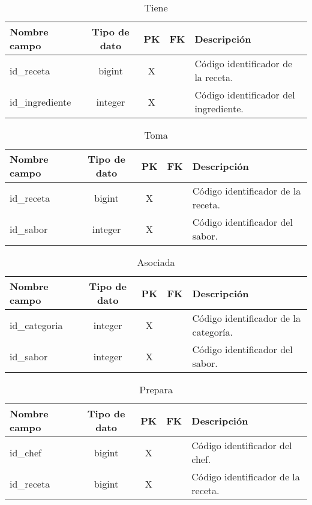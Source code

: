 \documentclass[12pt,a4paper]{article}
\begin{document}
\begin{table}[h!]
\centering
\begin{tabular}{|l|c|c|c|l|}
\hline
\textbf{Nombre campo}      & \textbf{Tipo de dato} & \textbf{PK} & \textbf{FK} & \textbf{Descripción} \\
\hline
id\_receta                 & bigint                & X           &             & Código identificador de la receta. \\
id\_ingrediente            & integer               & X           &             & Código identificador del ingrediente. \\
\hline
\end{tabular}
\caption{Tiene}
\label{table:tiene}
\end{table}

\begin{table}[h!]
\centering
\begin{tabular}{|l|c|c|c|l|}
\hline
\textbf{Nombre campo}      & \textbf{Tipo de dato} & \textbf{PK} & \textbf{FK} & \textbf{Descripción} \\
\hline
id\_receta                 & bigint                & X           &             & Código identificador de la receta. \\
id\_sabor                  & integer               & X           &             & Código identificador del sabor. \\
\hline
\end{tabular}
\caption{Toma}
\label{table:toma}
\end{table}

\begin{table}[h!]
\centering
\begin{tabular}{|l|c|c|c|l|}
\hline
\textbf{Nombre campo}      & \textbf{Tipo de dato} & \textbf{PK} & \textbf{FK} & \textbf{Descripción} \\
\hline
id\_categoria              & integer               & X           &             & Código identificador de la categoría. \\
id\_sabor                  & integer               & X           &             & Código identificador del sabor. \\
\hline
\end{tabular}
\caption{Asociada}
\label{table:asociada}
\end{table}

\begin{table}[h!]
\centering
\begin{tabular}{|l|c|c|c|l|}
\hline
\textbf{Nombre campo}      & \textbf{Tipo de dato} & \textbf{PK} & \textbf{FK} & \textbf{Descripción} \\
\hline
id\_chef                   & bigint                & X           &             & Código identificador del chef. \\
id\_receta                 & bigint                & X           &             & Código identificador de la receta. \\
\hline
\end{tabular}
\caption{Prepara}
\label{table:prepara}
\end{table}
\end{document}
